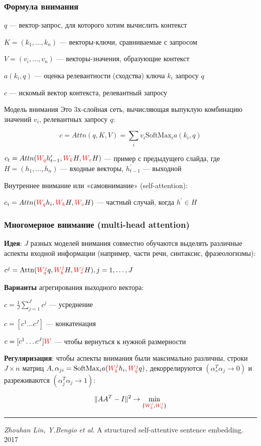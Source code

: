 \documentclass[fullscreen=true, bookmarks=true, hyperref={pdfencoding=unicode}]{beamer}
\begin{document}
\begin{frame}
  \frametitle{Формула внимания}

  $q$ — вектор-запрос, для которого хотим вычислить контекст

  $K = (k_1, \dots, k_n)$ — векторы-ключи, сравниваемые с запросом

  $V = (v_i, \dots, v_n)$ — векторы-значения, образующие контекст

  $a(k_i, q)$ — оценка релевантности (сходства) ключа $k_i$ запросу $q$

  $c$ — искомый вектор контекста, релевантный запросу

  {\small
  \begin{block}{Модель внимания}
   Это 3х-слойная сеть, вычисляющая выпуклую комбинацию значений $v_i$, релевантных запросу $q$:

   $$ c = Attn(q,K,V) = \sum\limits_i v_i \text{SoftMax}_i a(k_i, q) $$
 \end{block}
 }

  $c_t = Attn({\color{red}W_q} h^\prime_{t-1}, {\color{red}W_k} H, {\color{red}W_v} H)$ — пример с предыдущего слайда, где $H = (h_1, \dots, h_n)$ — входные векторы, $h^\prime_{t-1}$ — выходной


  Внутреннее внимание или «самовнимание» (self-attention):

  $c_i = Attn({\color{red}W_q} h_{i}, {\color{red}W_k} H, {\color{red}W_v} H)$ — частный случай, когда $h^\prime \in H$
\end{frame}


\begin{frame}
  \frametitle{Многомерное внимание (multi-head attention)}

  {\bf Идея}: $J$ разных моделей внимания совместно обучаются выделять различные аспекты входной информации (например, части речи, синтаксис, фразеологизмы):

  $ c^j = \text{Attn}({\color{red}W^j_q} q, {\color{red}W^j_k} H, {\color{red}W^j_v} H), j = 1, \dots, J$

  {\bf Варианты} агрегирования выходного вектора:

  $ c = \frac{1}{J} \sum\limits_{j=1}^J c^j$ — усреднение

  $ c = [c^1 \dots c^J]$ — конкатенация

  $ c = [c^1 \dots c^J] {\color{red}W}$ — чтобы вернуться к нужной размерности

  {\bf Регуляризация}: чтобы аспекты внимания были максимально различны, строки $J \times n$ матриц $A, \alpha_{ji} = \text{SoftMax}_i a({\color{red}W_k^j}h_i, {\color{red}W_q^j}q)$, декоррелируются $(\alpha_{s}^T\alpha_{j} \to 0)$ и разреживаются $(\alpha_{j}^T\alpha_{j} \to 1)$:

  $$\|AA^T - I \|^2 \to \min\limits_{\{{\color{red}W_k^j}, {\color{red}W_q^j}\}} $$

  \noindent\rule{8cm}{0.4pt}

  {\small
  {\it Zhouhan Lin, Y.Bengio et al}. A structured self-attentive sentence embedding. 2017}
\end{frame}
\end{document}
